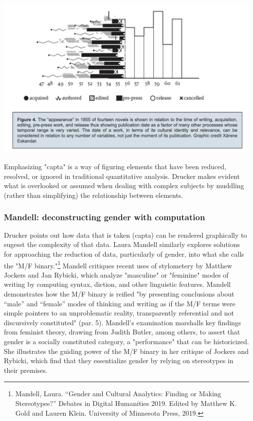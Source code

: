 \documentclass[11pt]{article}
\begin{document}
\begin{center}
\includegraphics[width=.9\linewidth]{./img/Drucker.png}
\end{center}

Emphasizing "capta" is a way of figuring elements that have been
reduced, resolved, or ignored in traditional quantitative
analysis. Drucker makes evident what is overlooked or assumed when
dealing with complex subjects by muddling (rather than simplifying)
the relationship between elements.

\subsubsection{Mandell: deconstructing gender with computation}
\label{sec:org700084d}
Drucker points out how data that is taken (capta) can be rendered
graphically to sugesst the complexity of that data. Laura Mandell
similarly explores solutions for approaching the reduction of data,
particularly of gender, into what she calls the "M/F binary."\footnote{Mandell, Laura. “Gender and Cultural Analytics: Finding or
Making Stereotypes?” Debates in Digital Humanities 2019. Edited by
Matthew K. Gold and Lauren Klein. University of Minnesota Press, 2019.}
Mandell critiques recent uses of stylometery by Matthew Jockers and
Jan Rybicki, which analyze "masculine" or "feminine" modes of writing
by computing syntax, diction, and other linguistic features. Mandell
demonstrates how the M/F binary is reified "by presenting conclusions
about “male” and “female” modes of thinking and writing as if the M/F
terms were simple pointers to an unproblematic reality, transparently
referential and not discursively constituted" (par. 5). Mandell's
examination marshalls key findings from feminist theory, drawing from
Judith Butler, among others, to assert that gender is a socially
constituted category, a "performance" that can be historicized. She
illustrates the guiding power of the M/F binary in her critique of
Jockers and Rybicki, which find that they essentialize gender by
relying on stereotypes in their premises.
\end{document}
